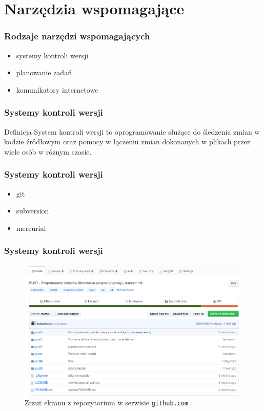 \section{Narzędzia wspomagające}
\label{narzedzia}

\begin{frame}
    \frametitle{Rodzaje narzędzi wspomagających}
    \begin{itemize}
        \item systemy kontroli wersji
        \item planowanie zadań
        \item komunikatory internetowe
    \end{itemize}
\end{frame}

\begin{frame}
    \frametitle{Systemy kontroli wersji}
    \begin{block}{Definicja}
        System kontroli wersji to oprogramowanie służące do śledzenia zmian 
        w kodzie źródłowym oraz pomocy w łączeniu zmian dokonanych w plikach przez 
        wiele osób w różnym czasie.
    \end{block}
\end{frame}

\begin{frame}
    \frametitle{Systemy kontroli wersji}
    \begin{itemize}
        \item git
        \item subversion
        \item mercurial
    \end{itemize}
\end{frame}

\begin{frame}
    \frametitle{Systemy kontroli wersji}
    \vspace{-0.5cm}
    \begin{figure}
        \leftskip-0.3cm
        \includegraphics[scale=0.35]{./images/git_example.png}
        \caption{Zrzut ekranu z repozytorium w serwisie \texttt{github.com}}
    \end{figure}
\end{frame}

